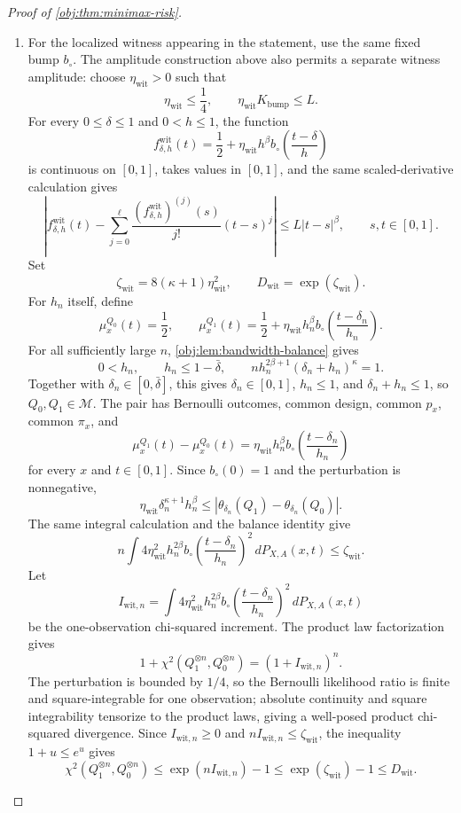 \begin{proof}[Proof of \cref{obj:thm:minimax-risk}]
\begin{enumerate}
\item For the localized witness appearing in the statement, use the same fixed bump
\(b_\circ\).  The amplitude construction above also permits a separate witness
amplitude: choose \(\eta_{\mathrm{wit}}>0\) such that
\[
\eta_{\mathrm{wit}}\le\frac14,
\qquad
\eta_{\mathrm{wit}}K_{\mathrm{bump}}\le L .
\]
For every \(0\le\delta\le1\) and \(0<h\le1\), the function
\[
f_{\delta,h}^{\mathrm{wit}}(t)
=
\frac12+\eta_{\mathrm{wit}} h^\beta b_\circ\!\left(\frac{t-\delta}{h}\right)
\]
is continuous on \([0,1]\), takes values in \([0,1]\), and the same scaled-derivative
calculation gives
\[
\left|
f_{\delta,h}^{\mathrm{wit}}(t)
-
\sum_{j=0}^{\ell}
\frac{(f_{\delta,h}^{\mathrm{wit}})^{(j)}(s)}{j!}(t-s)^j
\right|
\le
L|t-s|^\beta,
\qquad s,t\in[0,1].
\]
Set
\[
\zeta_{\mathrm{wit}}=8(\kappa+1)\eta_{\mathrm{wit}}^2,
\qquad
D_{\mathrm{wit}}=\exp(\zeta_{\mathrm{wit}}).
\]
For \(h_n\) itself, define
\[
\mu_x^{Q_0}(t)=\frac12,
\qquad
\mu_x^{Q_1}(t)=\frac12+
 \eta_{\mathrm{wit}} h_n^\beta b_\circ\!\left(\frac{t-\delta_n}{h_n}\right).
\]
For all sufficiently large \(n\), \cref{obj:lem:bandwidth-balance} gives
\[
0<h_n,
\qquad
h_n\le1-\bar\delta,
\qquad
n h_n^{2\beta+1}(\delta_n+h_n)^\kappa=1 .
\]
Together with \(\delta_n\in[0,\bar\delta]\), this gives \(\delta_n\in[0,1]\),
\(h_n\le1\), and \(\delta_n+h_n\le1\), so \(Q_0,Q_1\in\mathcal M\).  The pair has
Bernoulli outcomes, common design, common \(p_x\), common \(\pi_x\), and
\[
\mu_x^{Q_1}(t)-\mu_x^{Q_0}(t)
=
\eta_{\mathrm{wit}} h_n^\beta b_\circ\!\left(\frac{t-\delta_n}{h_n}\right)
\]
for every \(x\) and \(t\in[0,1]\).  Since \(b_\circ(0)=1\) and the perturbation is
nonnegative,
\[
\eta_{\mathrm{wit}}\delta_n^{\kappa+1}h_n^\beta
\le
\left|
\theta_{\delta_n}(Q_1)-\theta_{\delta_n}(Q_0)
\right|.
\]
The same integral calculation and the balance identity give
\[
n\int 4\eta_{\mathrm{wit}}^2h_n^{2\beta}
 b_\circ\!\left(\frac{t-\delta_n}{h_n}\right)^2
\,dP_{X,A}(x,t)
\le
\zeta_{\mathrm{wit}}.
\]
Let
\[
I_{\mathrm{wit},n}
=
\int 4\eta_{\mathrm{wit}}^2h_n^{2\beta}
 b_\circ\!\left(\frac{t-\delta_n}{h_n}\right)^2
\,dP_{X,A}(x,t)
\]
be the one-observation chi-squared increment.  The product law factorization gives
\[
1+\chi^2(Q_1^{\otimes n},Q_0^{\otimes n})
=
(1+I_{\mathrm{wit},n})^n .
\]
The perturbation is bounded by \(1/4\), so the Bernoulli likelihood ratio is finite and
square-integrable for one observation; absolute continuity and square integrability tensorize to
the product laws, giving a well-posed product chi-squared divergence.  Since
\(I_{\mathrm{wit},n}\ge0\) and \(nI_{\mathrm{wit},n}\le\zeta_{\mathrm{wit}}\), the inequality
\(1+u\le e^u\) gives
\[
\chi^2(Q_1^{\otimes n},Q_0^{\otimes n})
\le
\exp(nI_{\mathrm{wit},n})-1
\le
\exp(\zeta_{\mathrm{wit}})-1
\le
D_{\mathrm{wit}} .
\]


\end{enumerate}
\end{proof}
